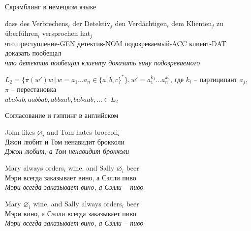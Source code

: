 \documentclass{beamer}
\begin{document}
\begin{frame}{Скрэмблинг в немецком языке}
\begin{scriptsize}
\begin{exe}
	\ex 
		\gll dass {des Verbrechens}$_i$ {der Detektiv}$_j$ {den Verd\"{a}chtigen}$_i$ {dem Klienten}$_j$ {zu \"{u}berf\"{u}hren}$_i$ {versprochen hat}$_j$\\
             что преступление-GEN детектив-NOM подозреваемый-ACC клиент-DAT доказать пообещал\\
		\glt \textit{что детектив пообещал клиенту доказать вину подозреваемого}
\end{exe}	
\end{scriptsize}
\medskip
$L_2 = \{\pi(w')w \, | \, w = a_1 \dots a_n \in \{a, b, c\}^*\}, w' = a_1^{k_1} \ldots a_n^{k_n}$, где $k_i$ -- партиципант $a_j$, $\pi$ -- перестановка\\
\smallskip
$ababab, aabbab, abbaab, babaab, \ldots \in L_2$
\end{frame}

\begin{frame}{Согласование и гэппинг в английском}
\begin{scriptsize}
\begin{exe}
	\ex 
		\gll John likes $\varnothing_i$ and Tom hates broccoli$_i$ \\
             Джон любит {} и Том ненавидит брокколи\\
		\glt \textit{Джон любит, а Том ненавидит брокколи}
\end{exe}	
\begin{exe}
	\ex 
		\gll Mary always orders$_i$ wine, and Sally $\varnothing_i$ beer \\
             Мэри всегда заказывает вино, а Сэлли {} пиво \\
		\glt \textit{Мэри всегда заказывает вино, а Сэлли -- пиво}
\end{exe}
\begin{exe}
	\ex 
		\gll *Mary $\varnothing_i$ wine, and Sally always orders$_i$ beer \\
             Мэри {} вино, а Сэлли всегда заказывает пиво \\
		\glt \textit{Мэри всегда заказывает вино, а Сэлли -- пиво}
\end{exe}
\end{scriptsize}
\end{frame}


\end{document}
